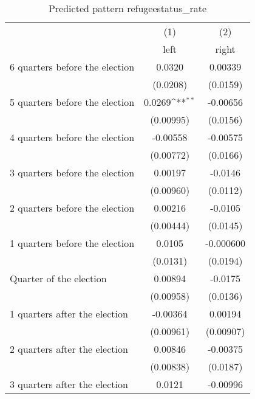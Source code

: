 \begin{table}[htbp]\centering
\def\sym#1{\ifmmode^{#1}\else\(^{#1}\)\fi}
\caption{Predicted pattern refugeestatus\_rate}
\begin{tabular}{l*{2}{c}}
\hline\hline
                    &\multicolumn{1}{c}{(1)}&\multicolumn{1}{c}{(2)}\\
                    &\multicolumn{1}{c}{left}&\multicolumn{1}{c}{right}\\
\hline
 6 quarters before the election&      0.0320         &     0.00339         \\
                    &    (0.0208)         &    (0.0159)         \\
[1em]
 5 quarters before the election&      0.0269\sym{**} &    -0.00656         \\
                    &   (0.00995)         &    (0.0156)         \\
[1em]
 4 quarters before the election&    -0.00558         &    -0.00575         \\
                    &   (0.00772)         &    (0.0166)         \\
[1em]
 3 quarters before the election&     0.00197         &     -0.0146         \\
                    &   (0.00960)         &    (0.0112)         \\
[1em]
 2 quarters before the election&     0.00216         &     -0.0105         \\
                    &   (0.00444)         &    (0.0145)         \\
[1em]
 1 quarters before the election&      0.0105         &   -0.000600         \\
                    &    (0.0131)         &    (0.0194)         \\
[1em]
Quarter of the election&     0.00894         &     -0.0175         \\
                    &   (0.00958)         &    (0.0136)         \\
[1em]
 1 quarters after the election&    -0.00364         &     0.00194         \\
                    &   (0.00961)         &   (0.00907)         \\
[1em]
 2 quarters after the election&     0.00846         &    -0.00375         \\
                    &   (0.00838)         &    (0.0187)         \\
[1em]
 3 quarters after the election&      0.0121         &    -0.00996         \\

\end{tabular}
\end{table}
